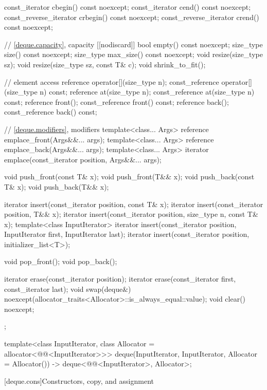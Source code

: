 \begin{codeblock}
{{    const_iterator         cbegin() const noexcept;
    const_iterator         cend() const noexcept;
    const_reverse_iterator crbegin() const noexcept;
    const_reverse_iterator crend() const noexcept;

    // \ref{deque.capacity}, capacity
    [[nodiscard]] bool empty() const noexcept;
    size_type size() const noexcept;
    size_type max_size() const noexcept;
    void      resize(size_type sz);
    void      resize(size_type sz, const T& c);
    void      shrink_to_fit();

    // element access
    reference       operator[](size_type n);
    const_reference operator[](size_type n) const;
    reference       at(size_type n);
    const_reference at(size_type n) const;
    reference       front();
    const_reference front() const;
    reference       back();
    const_reference back() const;

    // \ref{deque.modifiers}, modifiers
    template<class... Args> reference emplace_front(Args&&... args);
    template<class... Args> reference emplace_back(Args&&... args);
    template<class... Args> iterator emplace(const_iterator position, Args&&... args);

    void push_front(const T& x);
    void push_front(T&& x);
    void push_back(const T& x);
    void push_back(T&& x);

    iterator insert(const_iterator position, const T& x);
    iterator insert(const_iterator position, T&& x);
    iterator insert(const_iterator position, size_type n, const T& x);
    template<class InputIterator>
      iterator insert(const_iterator position, InputIterator first, InputIterator last);
    iterator insert(const_iterator position, initializer_list<T>);

    void pop_front();
    void pop_back();

    iterator erase(const_iterator position);
    iterator erase(const_iterator first, const_iterator last);
    void     swap(deque&)
      noexcept(allocator_traits<Allocator>::is_always_equal::value);
    void     clear() noexcept;
  };

  template<class InputIterator, class Allocator = allocator<@@<InputIterator>>>
    deque(InputIterator, InputIterator, Allocator = Allocator())
      -> deque<@@<InputIterator>, Allocator>;
}
\end{codeblock}

[deque.cons]{Constructors, copy, and assignment}

